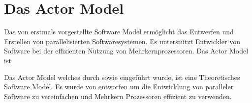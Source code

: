 \chapter{Das Actor Model}
Das von \cite{hewitt1973session} erstmals vorgestellte Software Model ermöglicht das Entwerfen und Erstellen von parallelisierten Softwaresystemen. Es unterstützt Entwickler von Software bei der effizienten Nutzung von Mehrkernprozessoren. Das Actor Model ist 

Das Actor Model welches durch \cite{hewitt1973session} sowie \cite{Agha1985ActorsSystems} eingeführt wurde, ist eine Theoretisches Software Model. 
Es wurde von \cite{hewitt1973session} entworfen um die Entwicklung von paralleler Software zu vereinfachen und Mehrkern Prozessoren effizient zu verwenden.